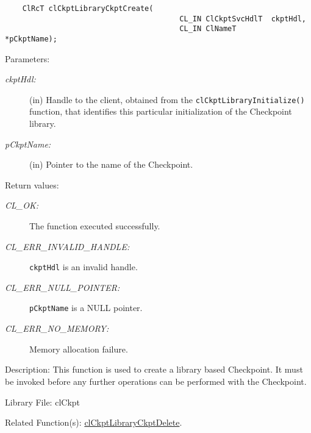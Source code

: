 \begin{flushleft}
\begin{Desc}
\footnotesize\begin{verbatim}    ClRcT clCkptLibraryCkptCreate(
                                		CL_IN ClCkptSvcHdlT  ckptHdl,
                                		CL_IN ClNameT       *pCkptName);
\end{verbatim}
\normalsize
\end{Desc}
\begin{Desc}
\item[Parameters:]
\begin{description}
\item[{\em ckpt\-Hdl:}](in) Handle to the client, obtained from the {\tt{clCkptLibraryInitialize()}} function, that identifies this particular 
initialization of the Checkpoint library. \item[{\em p\-Ckpt\-Name:}](in) Pointer to the name of the Checkpoint.\end{description}
\end{Desc}
\begin{Desc}
\item[Return values:]
\begin{description}
\item[{\em CL\_\-OK:}]The function executed successfully. 
\item[{\em CL\_\-ERR\_\-INVALID\_\-HANDLE:}]{\tt{ckptHdl}} is an invalid handle.
\item[{\em CL\_\-ERR\_\-NULL\_\-POINTER:}]{\tt{pCkptName}} is a NULL pointer. 
\item[{\em CL\_\-ERR\_\-NO\_\-MEMORY:}]Memory allocation failure.\end{description}
\end{Desc}
\begin{Desc}
\item[Description:]This function is used to create a library based Checkpoint. It must be invoked before any further operations can be performed 
with the Checkpoint.\end{Desc}
\begin{Desc}
\item[Library File:]cl\-Ckpt\end{Desc}
\begin{Desc}
\item[Related Function(s):]\hyperlink{group__group10}{cl\-Ckpt\-Library\-Ckpt\-Delete}. \end{Desc}
\newpage



\end{flushleft}
